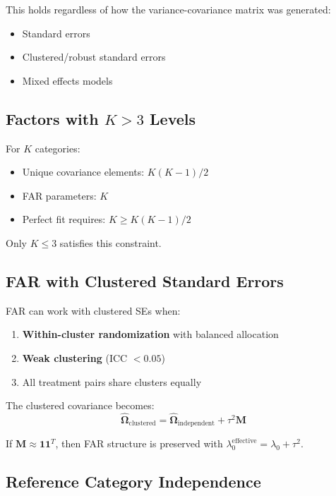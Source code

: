 \documentclass[11pt]{article}
\begin{document}
This holds regardless of how the variance-covariance matrix was generated:
\begin{itemize}
    \item Standard errors
    \item Clustered/robust standard errors
    \item Mixed effects models
\end{itemize}

\subsection{Factors with $K > 3$ Levels}

For $K$ categories:
\begin{itemize}
    \item Unique covariance elements: $K(K-1)/2$
    \item FAR parameters: $K$
    \item Perfect fit requires: $K \geq K(K-1)/2$
\end{itemize}

Only $K \leq 3$ satisfies this constraint.

\subsection{FAR with Clustered Standard Errors}

FAR can work with clustered SEs when:
\begin{enumerate}
    \item \textbf{Within-cluster randomization} with balanced allocation
    \item \textbf{Weak clustering} (ICC $< 0.05$)
    \item All treatment pairs share clusters equally
\end{enumerate}

The clustered covariance becomes:
\begin{equation}
    \hat{\boldsymbol{\Omega}}_{\text{clustered}} = \hat{\boldsymbol{\Omega}}_{\text{independent}} + \tau^2 \mathbf{M}
\end{equation}

If $\mathbf{M} \approx \mathbf{1}\mathbf{1}^T$, then FAR structure is preserved with $\lambda_0^{\text{effective}} = \lambda_0 + \tau^2$.

\subsection{Reference Category Independence}
\end{document}

